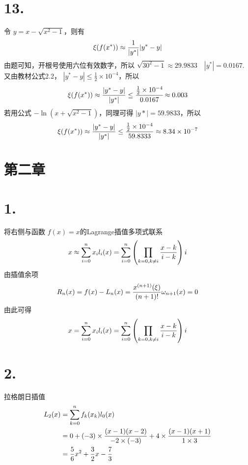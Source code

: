 \documentclass[12pt, a4paper, oneside]{ctexart}
\begin{document}
\section*{13.}
\noindent 
令 $y = x - \sqrt{x^2-1}$，则有
\begin{equation}
    \begin{split}
        \xi (f(x^*)) \approx \frac{1}{|y^*|}|y^*-y| \notag
    \end{split}
\end{equation}
由题可知，开根号使用六位有效数字，所以 $\sqrt{30^2 -1} \approx 29.9833 \quad |y^*| = 0.0167$.
又由教材公式2.2， $|y^*-y| \leq \frac{1}{2} \times 10^{-4}$，所以
\begin{equation}
    \xi(f(x^*)) \approx \frac{|y^*-y|}{|y^*|} \leq \cfrac{\frac{1}{2} \times 10^{-4}}{0.0167} \approx 0.003 \notag
\end{equation}
若用公式 $-\ln (x+\sqrt{x^2-1})$，同理可得 $|y*|=59.9833$，所以
\begin{equation}
    \xi (f(x^*)) \approx \frac{|y^*-y|}{|y^*|}\leq \frac{\frac{1}{2}\times 10^{-4}}{59.8333} \approx 8.34 \times 10^{-7} \notag
\end{equation}


\section*{第二章}
\section*{1.}
\noindent
将右侧与函数 $f(x)=x$的Lagrange插值多项式联系
\begin{equation}
    x \approx \sum_{i=0}^{n}x_i l_i(x) = \sum_{i=0}^{n} \left( \prod_{k=0, k \neq i} \frac{x-k}{i-k} \right)i \notag
\end{equation}
由插值余项
\begin{equation}
    R_n(x)=f(x)-L_n(x)=\frac{x^{(n+1)}(\xi)}{(n+1)!}\omega_{n+1}(x) = 0 \notag
\end{equation}
由此可得
\begin{equation}
    x = \sum_{i=0}^{n}x_i l_i(x) = \sum_{i=0}^{n} \left( \prod_{k=0, k \neq i} \frac{x-k}{i-k} \right)i \notag
\end{equation}

\section*{2.}
\noindent
拉格朗日插值
\begin{equation}
    \begin{split}
        L_2(x) &= \sum_{k=0}^{n}f_k(x_k)l_0(x) \\
        &= 0 + (-3) \times \frac{(x-1)(x-2)}{-2\times (-3)} + 4\times \frac{(x-1)(x+1)}{1\times 3} \\
        &= \frac{5}{6}x^2 + \frac{3}{2}x - \frac{7}{3}
    \end{split}
    \notag
\end{equation}
\end{document}
